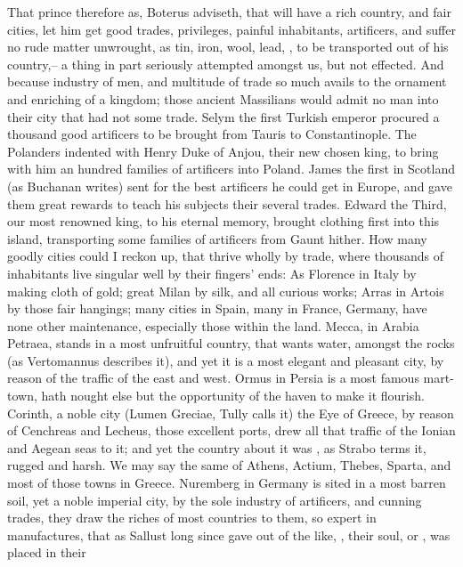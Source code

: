 That prince therefore as, Boterus adviseth, that will have
a rich country, and fair cities, let him get good trades, privileges, painful
inhabitants, artificers, and suffer no rude matter unwrought, as tin, iron,
wool, lead, \etc{}, to be transported out of his country,--
a thing in part seriously attempted amongst us, but not
effected. And because industry of men, and multitude of trade so much avails to
the ornament and enriching of a kingdom; those ancient
Massilians would admit no man into their city that had not
some trade. Selym the first Turkish emperor procured a thousand good artificers
to be brought from Tauris to Constantinople. The Polanders indented with Henry
Duke of Anjou, their new chosen king, to bring with him an hundred families of
artificers into Poland. James the first in Scotland (as
Buchanan writes) sent for the best artificers he could get
in Europe, and gave them great rewards to teach his subjects their several
trades. Edward the Third, our most renowned king, to his eternal memory,
brought clothing first into this island, transporting some families of
artificers from Gaunt hither. How many goodly cities could I reckon up, that
thrive wholly by trade, where thousands of inhabitants live singular well by
their fingers' ends: As Florence in Italy by making cloth of gold; great Milan
by silk, and all curious works; Arras in Artois by those fair hangings; many
cities in Spain, many in France, Germany, have none other maintenance,
especially those within the land. Mecca, in Arabia Petraea,
stands in a most unfruitful country, that wants water, amongst the rocks (as
Vertomannus describes it), and yet it is a most elegant and pleasant city, by
reason of the traffic of the east and west. Ormus in Persia is a most famous
mart-town, hath nought else but the opportunity of the haven to make it
flourish. Corinth, a noble city (Lumen Greciae, Tully calls it) the Eye of
Greece, by reason of Cenchreas and Lecheus, those excellent ports, drew all
that traffic of the Ionian and Aegean seas to it; and yet the country about it
was , as Strabo terms it, rugged
and harsh. We may say the same of Athens, Actium, Thebes, Sparta, and most of
those towns in Greece. Nuremberg in Germany is sited in a most barren soil, yet
a noble imperial city, by the sole industry of artificers, and cunning trades,
they draw the riches of most countries to them, so expert in manufactures, that
as Sallust long since gave out of the like, , their soul, or , was placed in their
